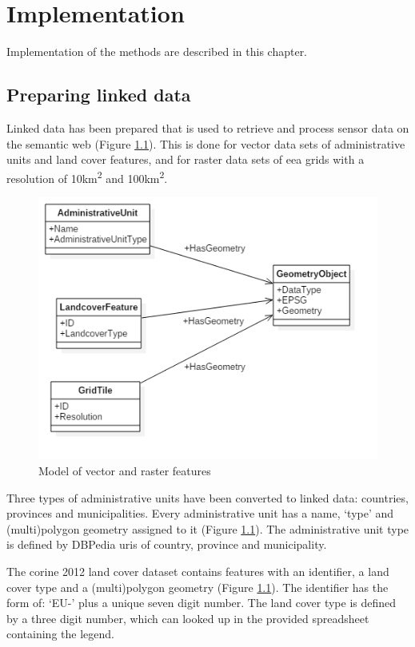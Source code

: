 
\chapter{Implementation}
\label{chap:impl}

Implementation of the methods are described in this chapter.

\section{Preparing linked data}
Linked data has been prepared that is used to retrieve and process sensor data on the semantic web (Figure \ref*{fig:Static}). This is done for vector data sets of administrative units and land cover features, and for raster data sets of \ac{eea} grids with a resolution of 10km\textsuperscript{2} and 100km\textsuperscript{2}. 

\begin{figure}
	\includegraphics[width=0.7\linewidth]{UML/staticdata2.PNG}
	\caption{Model of vector and raster features}
	\label{fig:Static}
\end{figure}


Three types of administrative units have been converted to linked data: countries, provinces and municipalities. Every administrative unit has a name, `type' and (multi)polygon geometry assigned to it (Figure \ref{fig:Static}). The administrative unit type is defined by DBPedia \ac{uri}s of country, province and municipality. 

The \ac{corine} 2012 land cover dataset contains features with an identifier, a land cover type and a (multi)polygon geometry (Figure \ref{fig:Static}). The identifier has the form of: `EU-' plus a unique seven digit number. The land cover type is defined by a three digit number, which can looked up in the provided spreadsheet containing the legend.    

